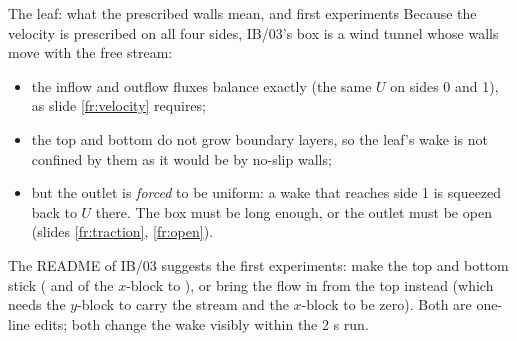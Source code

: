 \documentclass[aspectratio=169,11pt]{beamer}
\begin{document}
\begin{frame}{The leaf: what the prescribed walls mean, and first experiments}
\label{fr:leaf3}
\small Because the velocity is prescribed on all four sides, IB/03's box is a wind tunnel whose walls move with the free stream:
\begin{itemize}
  \item the inflow and outflow fluxes balance exactly (the same $U$ on sides 0 and 1), as slide \ref{fr:velocity} requires;
  \item the top and bottom do not grow boundary layers, so the leaf's wake is not confined by them as it would be by no-slip walls;
  \item but the outlet is \emph{forced} to be uniform: a wake that reaches side 1 is squeezed back to $U$ there. The box must be long enough, or the outlet must be open (slides \ref{fr:traction}, \ref{fr:open}).
\end{itemize}
\vspace{1mm}
\begin{punchbox}
\small The README of IB/03 suggests the first experiments: make the top and bottom stick ( and  of the $x$-block to ), or bring the flow in from the top instead (which needs the $y$-block to carry the stream and the $x$-block to be zero). Both are one-line edits; both change the wake visibly within the 2 s run.
\end{punchbox}
\end{frame}
\end{document}
